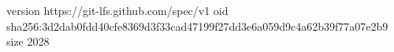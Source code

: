 version https://git-lfs.github.com/spec/v1
oid sha256:3d2dab0fdd40cfe8369d3f33cad47199f27dd3e6a059d9c4a62b39f77a07e2b9
size 2028
